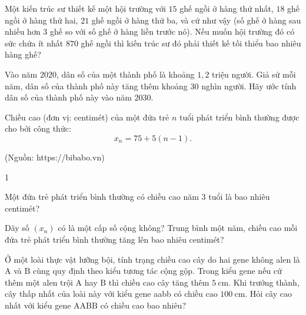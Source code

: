 \begin{baitap}
	Một kiến trúc sư thiết kế một hội trường với $ 15 $ ghế ngồi ở hàng thứ nhất, $ 18 $ ghế ngồi ở hàng thứ hai, $ 21 $ ghế ngồi ở hàng thứ ba, và cứ như vậy (số ghế ở hàng sau nhiều hơn $ 3 $ ghế so với số ghế ở hàng liền trước nó). Nếu muốn hội trường đó có sức chứa ít nhất $ 870 $ ghế ngồi thì kiến trúc sư đó phải thiết kế tối thiểu bao nhiêu hàng ghế?
\end{baitap}
\begin{baitap}
	Vào năm $ 2020 $, dân số của một thành phố là khoảng $ 1,2 $ triệu người. Giả sử mỗi năm, dân số của thành phố này tăng thêm khoảng $ 30 $ nghìn người. Hãy ước tính dân số của thành phố này vào năm $ 2030 $.
\end{baitap}
\begin{baitap}
	Chiều cao (đơn vị: centimét) của một đứa trẻ $n$ tuổi phát triển bình thường được cho bởi công thức:	
	$$x_n=75+5(n-1).$$
	\begin{flushright}
		(Nguồn: https://bibabo.vn)
	\end{flushright}
	\begin{enumEX}{1}
		\item Một đứa trẻ phát triển bình thường có chiều cao năm 3 tuổi là bao nhiêu centimét?
		\item Dãy số $\left(x_n\right)$ có là một cấp số cộng không? Trung bình một năm, chiều cao mỗi đứa trẻ phát triển bình thường tăng lên bao nhiêu centimét?
	\end{enumEX}
\end{baitap}
\begin{baitap}
	Ở một loài thực vật lưỡng bội, tính trạng chiều cao cây do hai gene không alen là $\mathrm{A}$ và $\mathrm{B}$ cùng quy định theo kiểu tương tác cộng gộp. Trong kiểu gene nếu cứ thêm một alen trội $\mathrm{A}$ hay $\mathrm{B}$ thì chiều cao cây tăng thêm $5 \mathrm{~cm}$. Khi trưởng thành, cây thấp nhất của loài này với kiểu gene aabb có chiều cao $100 \mathrm{~cm}$. Hỏi cây cao nhất với kiểu gene $\mathrm{AABB}$ có chiều cao bao nhiêu?
	\loigiai{
	}
\end{baitap}
 


